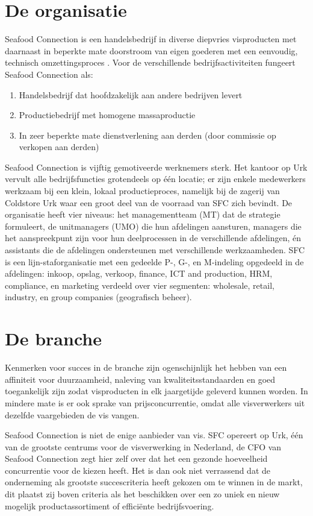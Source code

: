 \section{De organisatie}
Seafood Connection is een handelsbedrijf in diverse diepvries visproducten met daarnaast in beperkte mate doorstroom van eigen goederen met een eenvoudig, technisch omzettingsproces \citep{aoibsfc}. Voor de verschillende bedrijfsactiviteiten fungeert Seafood Connection als:

\begin{enumerate}
    \item Handelsbedrijf dat hoofdzakelijk aan andere bedrijven levert
    \item Productiebedrijf met homogene massaproductie
    \item In zeer beperkte mate dienstverlening aan derden (door commissie op verkopen aan derden)
\end{enumerate}

Seafood Connection is vijftig gemotiveerde werknemers sterk. Het kantoor op Urk vervult alle bedrijfsfuncties grotendeels op één locatie; er zijn enkele medewerkers werkzaam bij een klein, lokaal productieproces, namelijk bij de zagerij van Coldstore Urk waar een groot deel van de voorraad van SFC zich bevindt. De organisatie heeft vier niveaus: het managementteam (MT) dat de strategie formuleert, de unitmanagers (UMO) die hun afdelingen aansturen, managers die het aanspreekpunt zijn voor hun deelprocessen in de verschillende afdelingen, én assistants die de afdelingen ondersteunen met verschillende werkzaamheden. SFC is een lijn-staforganisatie met een gedeelde P-, G-, en M-indeling opgedeeld in de afdelingen: inkoop, opslag, verkoop, finance, ICT and production, HRM, compliance, en marketing verdeeld over vier segmenten: wholesale, retail, industry, en group companies (geografisch beheer). \citep{quickscan}

\section{De branche}
Kenmerken voor succes in de branche zijn ogenschijnlijk het hebben van een affiniteit voor duurzaamheid, naleving van kwaliteitsstandaarden en goed toegankelijk zijn zodat visproducten in elk jaargetijde geleverd kunnen worden. In mindere mate is er ook sprake van prijsconcurrentie, omdat alle visverwerkers uit dezelfde vaargebieden de vis vangen. 

Seafood Connection is niet de enige aanbieder van vis. SFC opereert op Urk, één van de grootste centrums voor de visverwerking in Nederland, de CFO van Seafood Connection zegt hier zelf over dat het een gezonde hoeveelheid concurrentie voor de kiezen heeft. Het is dan ook niet verrassend dat de onderneming als grootste succescriteria heeft gekozen om te winnen in de markt, dit plaatst zij boven criteria als het beschikken over een zo uniek en nieuw mogelijk productassortiment of efficiënte bedrijfsvoering. 

